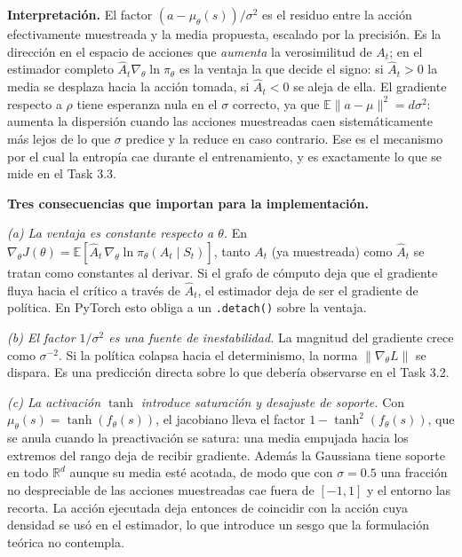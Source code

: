 \documentclass[11pt,letterpaper]{article}
\newcommand{\Esp}{\mathbb{E}}
\newcommand{\lead}[1]{\textbf{#1}}
\begin{document}
\begin{respuesta}
\medskip
\lead{Interpretación.} El factor $(a-\mu_\theta(s))/\sigma^2$ es el residuo entre la
acción efectivamente muestreada y la media propuesta, escalado por la precisión. Es la
dirección en el espacio de acciones que \emph{aumenta} la verosimilitud de $A_t$; en el
estimador completo $\hat{A}_t \nabla_\theta \ln\pi_\theta$ es la ventaja la que decide el
signo: si $\hat{A}_t > 0$ la media se desplaza hacia la acción tomada, si $\hat{A}_t < 0$
se aleja de ella. El gradiente respecto a $\rho$ tiene esperanza nula en el $\sigma$
correcto, ya que $\Esp\lVert a-\mu\rVert^2 = d\sigma^2$: aumenta la dispersión cuando las
acciones muestreadas caen sistemáticamente más lejos de lo que $\sigma$ predice y la
reduce en caso contrario. Ese es el mecanismo por el cual la entropía cae durante el
entrenamiento, y es exactamente lo que se mide en el Task 3.3.

\medskip
\lead{Tres consecuencias que importan para la implementación.}

\emph{(a) La ventaja es constante respecto a $\theta$.} En
$\nabla_\theta J(\theta) = \Esp[\hat{A}_t\,\nabla_\theta \ln\pi_\theta(A_t\mid S_t)]$, tanto
$A_t$ (ya muestreada) como $\hat{A}_t$ se tratan como constantes al derivar. Si el grafo
de cómputo deja que el gradiente fluya hacia el crítico a través de $\hat{A}_t$, el
estimador deja de ser el gradiente de política. En PyTorch esto obliga a un
\texttt{.detach()} sobre la ventaja.

\emph{(b) El factor $1/\sigma^2$ es una fuente de inestabilidad.} La magnitud del
gradiente crece como $\sigma^{-2}$. Si la política colapsa hacia el determinismo, la
norma $\lVert\nabla_\theta L\rVert$ se dispara. Es una predicción directa sobre lo que
debería observarse en el Task 3.2.

\emph{(c) La activación $\tanh$ introduce saturación y desajuste de soporte.} Con
$\mu_\theta(s) = \tanh(f_\theta(s))$, el jacobiano lleva el factor
$1-\tanh^2(f_\theta(s))$, que se anula cuando la preactivación se satura: una media
empujada hacia los extremos del rango deja de recibir gradiente. Además la Gaussiana
tiene soporte en todo $\mathbb{R}^d$ aunque su media esté acotada, de modo que con
$\sigma = 0.5$ una fracción no despreciable de las acciones muestreadas cae fuera de
$[-1,1]$ y el entorno las recorta. La acción ejecutada deja entonces de coincidir con la
acción cuya densidad se usó en el estimador, lo que introduce un sesgo que la formulación
teórica no contempla.
\end{respuesta}
\end{document}

